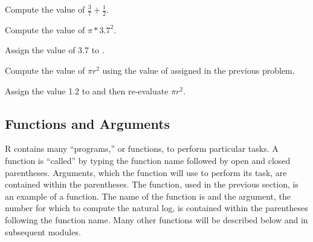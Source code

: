\documentclass[10pt,openany]{book}\usepackage[]{graphicx}\usepackage[]{color}
\begin{document}

\vspace{-12pt}


\begin{exsection}
  \item \label{revex:BasicsExpr1} \rhw{} Compute the value of $\frac{3}{7}+\frac{1}{2}$. 
  \item \label{revex:BasicsExpr2} \rhw{} Compute the value of $\pi*3.7^{2}$. 
  \item \label{revex:BasicsExpr3} \rhw{} Assign the value of 3.7 to . 
  \item \label{revex:BasicsExpr4} \rhw{} Compute the value of $\pi r^{2}$ using the value of  assigned in the previous problem. 
  \item \label{revex:BasicsExpr5} \rhw{} \hspace{18pt} Assign the value 1.2 to  and then re-evaluate $\pi r^{2}$. 
\end{exsection}


\subsection{Functions and Arguments}  \label{sect:RFunctions}
R contains many ``programs,'' or functions, to perform particular tasks.  A function is ``called'' by typing the function name followed by open and closed parentheses.  Arguments, which the function will use to perform its task, are contained within the parentheses.  The  function, used in the previous section, is an example of a function.  The name of the function is  and the argument, the number for which to compute the natural log, is contained within the parentheses following the function name.  Many other functions will be described below and in subsequent modules.


\vspace{-12pt}

\vspace{-12pt}
\end{document}
